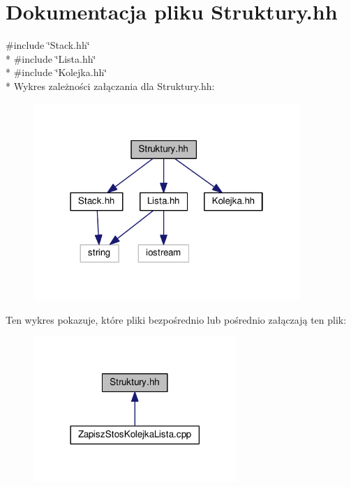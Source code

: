 \section{Dokumentacja pliku Struktury.\-hh}
\label{_struktury_8hh}
{\ttfamily \#include \char`\"{}Stack.\-hh\char`\"{}}\\*
{\ttfamily \#include \char`\"{}Lista.\-hh\char`\"{}}\\*
{\ttfamily \#include \char`\"{}Kolejka.\-hh\char`\"{}}\\*
Wykres zależności załączania dla Struktury.\-hh\-:\nopagebreak
\begin{figure}[H]
\begin{center}
\leavevmode
\includegraphics[width=286pt]{_struktury_8hh__incl}
\end{center}
\end{figure}
Ten wykres pokazuje, które pliki bezpośrednio lub pośrednio załączają ten plik\-:\nopagebreak
\begin{figure}[H]
\begin{center}
\leavevmode
\includegraphics[width=218pt]{_struktury_8hh__dep__incl}
\end{center}
\end{figure}
